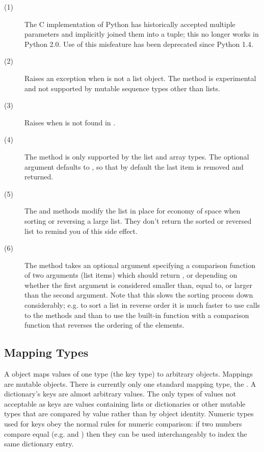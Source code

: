 \begin{description}
\item[(1)] The C implementation of Python has historically accepted
  multiple parameters and implicitly joined them into a tuple; this
  no longer works in Python 2.0.  Use of this misfeature has been
  deprecated since Python 1.4.

\item[(2)] Raises an exception when  is not a list object.  The 
   method is experimental and not supported by
  mutable sequence types other than lists.

\item[(3)] Raises  when  is not found in
  .

\item[(4)] The  method is only supported by the list and
  array types.  The optional argument  defaults to ,
  so that by default the last item is removed and returned.

\item[(5)] The  and  methods modify the
  list in place for economy of space when sorting or reversing a large
  list.  They don't return the sorted or reversed list to remind you
  of this side effect.

\item[(6)] The  method takes an optional argument
  specifying a comparison function of two arguments (list items) which
  should return ,  or  depending on whether
  the first argument is considered smaller than, equal to, or larger
  than the second argument.  Note that this slows the sorting process
  down considerably; e.g. to sort a list in reverse order it is much
  faster to use calls to the methods  and
   than to use the built-in function
   with a comparison function that reverses the
  ordering of the elements.
\end{description}


\subsection{Mapping Types \label{typesmapping}}

A  object maps values of one type (the key type) to
arbitrary objects.  Mappings are mutable objects.  There is currently
only one standard mapping type, the .  A dictionary's keys are
almost arbitrary values.  The only types of values not acceptable as
keys are values containing lists or dictionaries or other mutable
types that are compared by value rather than by object identity.
Numeric types used for keys obey the normal rules for numeric
comparison: if two numbers compare equal (e.g.  and
) then they can be used interchangeably to index the same
dictionary entry.

